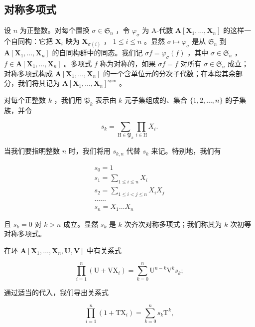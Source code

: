 \subsection{对称多项式}

设 \(n\) 为正整数。对每个置换 \(\sigma \in \mathfrak{S}_n\) ，令 \(\varphi_{\sigma}\) 为 A-代数 \(\mathbf{A}[\mathbf{X}_1, \ldots, \mathbf{X}_n]\) 的这样一个自同构：它把 \(\mathbf{X}_i\) 映为 \(\mathbf{X}_{\sigma(i)}\) ， \(1 \leqslant i \leqslant n\) 。显然 \(\sigma \mapsto \varphi_{\sigma}\) 是从 \(\mathfrak{S}_n\) 到 \(\mathbf{A}[\mathbf{X}_1, \ldots, \mathbf{X}_n]\) 的自同构群中的同态。我们记 \(\sigma f = \varphi_{\sigma}(f)\) ，其中 \(\sigma \in \mathfrak{S}_n\) ， \(f \in \mathbf{A}[\mathbf{X}_1, \ldots, \mathbf{X}_n]\) 。多项式 \(f\) 称为对称的，如果 \(\sigma f = f\) 对所有 \(\sigma \in \mathfrak{S}_n\) 成立；对称多项式构成 \(\mathbf{A}[\mathbf{X}_1, \ldots, \mathbf{X}_n]\) 的一个含单位元的分次子代数；在本段其余部分，我们将其记为 \(\mathbf{A}[\mathbf{X}_1, \ldots, \mathbf{X}_n]^{\text{sym}}\) 。

对每个正整数 \(k\) ，我们用 \(\mathfrak{P}_k\) 表示由 \(k\) 元子集组成的、集合 \(\{1, 2, \ldots, n\}\) 的子集族，并令

\[
s _ {k} = \sum_ {\mathrm{H} \in \mathfrak {P} _ {k}} \prod_ {i \in \mathrm{H}} X _ {i}.\tag{1}
\]

当我们要指明整数 \(n\) 时，我们将用 \(s_{k,n}\) 代替 \(s_k\) 来记。特别地，我们有

\[
\begin{array}{l} s _ {0} = 1 \\ s _ {1} = \sum_ {1 \leqslant i \leqslant n} X _ {i} \\ s _ {2} = \sum_ {1 \leqslant i <   j \leqslant n} X _ {i} X _ {j} \\ \dots \dots \\ s _ {n} = X _ {1} \dots X _ {n} \end{array}
\]

且 \(s_k = 0\) 对 \(k > n\) 成立。显然 \(s_k\) 是 \(k\) 次齐次对称多项式；我们称其为 \(k\) 次初等对称多项式。

在环 \(\mathbf{A}[\mathbf{X}_1,\dots ,\mathbf{X}_n,\mathbf{U},\mathbf{V}]\) 中有关系式

\[
\prod_ {i = 1} ^ {n} \left(\mathrm{U} + \mathrm{VX} _ {i}\right) = \sum_ {k = 0} ^ {n} \mathrm{U} ^ {n - k} \mathrm{V} ^ {k} s _ {k};\tag{2}
\]

通过适当的代入，我们导出关系式

\[
\prod_ {i = 1} ^ {n} \left(1 + \mathrm{TX} _ {i}\right) = \sum_ {k = 0} ^ {n} s _ {k} \mathrm{T} ^ {k},\tag{3}
\]

